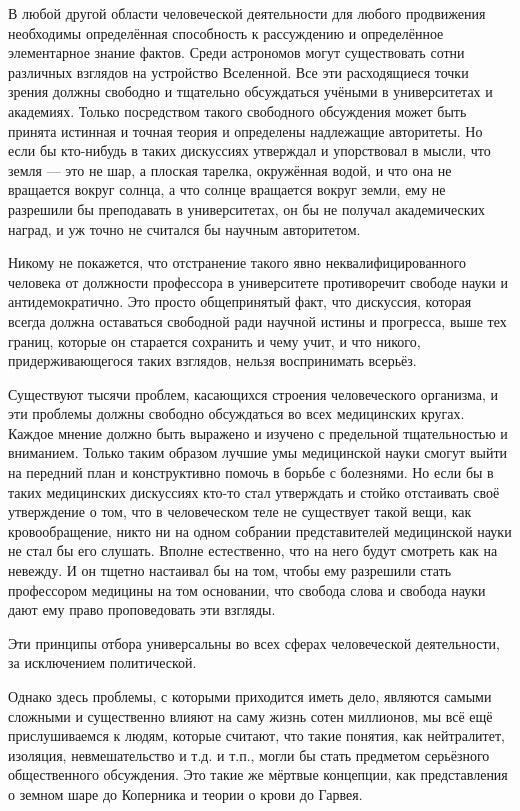 В любой другой области человеческой деятельности для любого продвижения необходимы определённая способность к рассуждению и определённое элементарное знание фактов. Среди астрономов могут существовать сотни различных взглядов на устройство Вселенной. Все эти расходящиеся точки зрения должны свободно и тщательно обсуждаться учёными в университетах и академиях. Только посредством такого свободного обсуждения может быть принята истинная и точная теория и определены надлежащие авторитеты. Но если бы кто-нибудь в таких дискуссиях утверждал и упорствовал в мысли, что земля — это не шар, а плоская тарелка, окружённая водой, и что она не вращается вокруг солнца, а что солнце вращается вокруг земли, ему не разрешили бы преподавать в университетах, он бы не получал академических наград, и уж точно не считался бы научным авторитетом.
 
Никому не покажется, что отстранение такого явно неквалифицированного человека от должности профессора в университете противоречит свободе науки и антидемократично. Это просто общепринятый факт, что дискуссия, которая всегда должна оставаться свободной ради научной истины и прогресса, выше тех границ, которые он старается сохранить и чему учит, и что никого, придерживающегося таких взглядов, нельзя воспринимать всерьёз.

Существуют тысячи проблем, касающихся строения человеческого организма, и эти проблемы должны свободно обсуждаться во всех медицинских кругах. Каждое мнение должно быть выражено и изучено с предельной тщательностью и вниманием. Только таким образом лучшие умы медицинской науки смогут выйти на передний план и конструктивно помочь в борьбе с болезнями. Но если бы в таких медицинских дискуссиях кто-то стал утверждать и стойко отстаивать своё утверждение о том, что в человеческом теле не существует такой вещи, как кровообращение, никто ни на одном собрании представителей медицинской науки не стал бы его слушать. Вполне естественно, что на него будут смотреть как на невежду. И он тщетно настаивал бы на том, чтобы ему разрешили стать профессором медицины на том основании, что свобода слова и свобода науки дают ему право проповедовать эти взгляды.
 
Эти принципы отбора универсальны во всех сферах человеческой деятельности, за исключением политической.

Однако здесь проблемы, с которыми приходится иметь дело, являются самыми сложными и существенно влияют на саму жизнь сотен миллионов, мы всё ещё прислушиваемся к людям, которые считают, что такие понятия, как нейтралитет, изоляция, невмешательство и т.д. и т.п., могли бы стать предметом серьёзного общественного обсуждения. Это такие же мёртвые концепции, как представления о земном шаре до Коперника и теории о крови до Гарвея.
 
